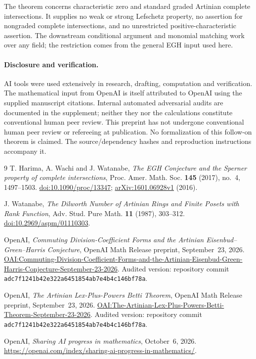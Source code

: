 \documentclass[11pt]{article}
\begin{document}
The theorem concerns characteristic zero and standard graded Artinian
complete intersections. It supplies no weak or strong Lefschetz property,
no assertion for nongraded complete intersections, and no unrestricted
positive-characteristic assertion. The downstream conditional argument
and monomial matching work over any field; the restriction comes from
the general EGH input used here.

\paragraph{Disclosure and verification.}
AI tools were used extensively in research, drafting, computation and
verification. The mathematical input from OpenAI is itself attributed
to OpenAI using the supplied manuscript citations. Internal automated
adversarial audits are documented in the supplement; neither they nor
the calculations constitute conventional human peer review. This
preprint has not undergone conventional human peer review or refereeing
at publication. No formalization of this follow-on theorem is claimed.
The source/dependency hashes and reproduction instructions accompany it.

\begin{thebibliography}{9}
T. Harima, A. Wachi and J. Watanabe,
\emph{The EGH Conjecture and the Sperner property of complete intersections},
Proc. Amer. Math. Soc. \textbf{145} (2017), no.~4, 1497--1503.
\href{https://doi.org/10.1090/proc/13347}{doi:10.1090/proc/13347};
\href{https://arxiv.org/abs/1601.06928v1}{arXiv:1601.06928v1} (2016).

J. Watanabe, \emph{The Dilworth Number of Artinian Rings and Finite Posets
with Rank Function}, Adv. Stud. Pure Math. \textbf{11} (1987), 303--312.
\href{https://doi.org/10.2969/aspm/01110303}{doi:10.2969/aspm/01110303}.

OpenAI, \emph{Commuting Division-Coefficient Forms and the Artinian
Eisenbud--Green--Harris Conjecture}, OpenAI Math Release preprint,
September~23, 2026.
\href{https://github.com/openai/math/blob/main/preprints/Commuting-Division-Coefficient-Forms-and-the-Artinian-Eisenbud-Green-Harris-Conjecture-September-23-2026/paper.pdf}{OAI:Commuting-Division-Coefficient-Forms-and-the-Artinian-Eisenbud-Green-Harris-Conjecture-September-23-2026}.
Audited version: repository commit
\texttt{adc7f1241b42e322a6451854ab7e4b4c146bf78a}.

OpenAI, \emph{The Artinian Lex-Plus-Powers Betti Theorem},
OpenAI Math Release preprint, September~23, 2026.
\href{https://github.com/openai/math/blob/main/preprints/The-Artinian-Lex-Plus-Powers-Betti-Theorem-September-23-2026/paper.pdf}{OAI:The-Artinian-Lex-Plus-Powers-Betti-Theorem-September-23-2026}.
Audited version: repository commit
\texttt{adc7f1241b42e322a6451854ab7e4b4c146bf78a}.

OpenAI, \emph{Sharing AI progress in mathematics}, October~6, 2026.
\url{https://openai.com/index/sharing-ai-progress-in-mathematics/}.
\end{thebibliography}
\end{document}
